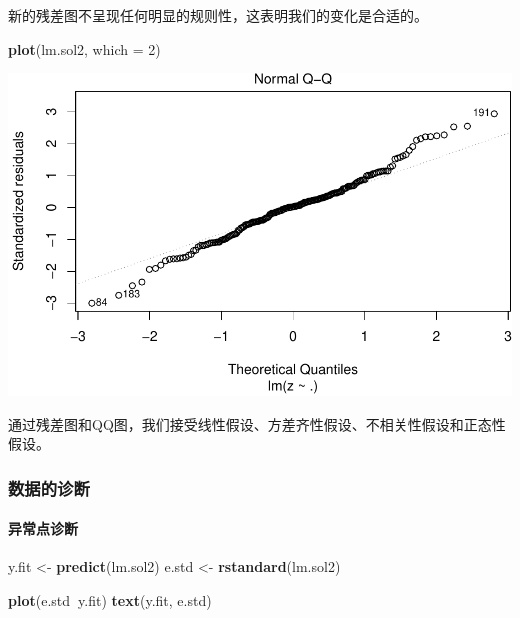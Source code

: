 \documentclass[]{article}
\newenvironment{Shaded}{\begin{snugshade}}{\end{snugshade}}
\newcommand{\KeywordTok}[1]{\textcolor[rgb]{0.13,0.29,0.53}{\textbf{#1}}}
\newcommand{\DataTypeTok}[1]{\textcolor[rgb]{0.13,0.29,0.53}{#1}}
\newcommand{\DecValTok}[1]{\textcolor[rgb]{0.00,0.00,0.81}{#1}}
\newcommand{\StringTok}[1]{\textcolor[rgb]{0.31,0.60,0.02}{#1}}
\newcommand{\OperatorTok}[1]{\textcolor[rgb]{0.81,0.36,0.00}{\textbf{#1}}}
\newcommand{\NormalTok}[1]{#1}
\let\oldparagraph\paragraph
\renewcommand{\paragraph}[1]{\oldparagraph{#1}\mbox{}}
\begin{document}
新的残差图不呈现任何明显的规则性，这表明我们的变化是合适的。

\begin{Shaded}
\begin{Highlighting}[]
\KeywordTok{plot}\NormalTok{(lm.sol2, }\DataTypeTok{which =} \DecValTok{2}\NormalTok{)}
\end{Highlighting}
\end{Shaded}

\includegraphics{FinalProjectForRegressionAnalysis_files/figure-latex/unnamed-chunk-11-1.pdf}

通过残差图和QQ图，我们接受线性假设、方差齐性假设、不相关性假设和正态性假设。

\subsubsection{数据的诊断}

\paragraph{异常点诊断}

\begin{Shaded}
\begin{Highlighting}[]
\NormalTok{y.fit <-}\StringTok{ }\KeywordTok{predict}\NormalTok{(lm.sol2)}
\NormalTok{e.std <-}\StringTok{ }\KeywordTok{rstandard}\NormalTok{(lm.sol2)}

\KeywordTok{plot}\NormalTok{(e.std}\OperatorTok{~}\NormalTok{y.fit)}
\KeywordTok{text}\NormalTok{(y.fit, e.std)}
\end{Highlighting}
\end{Shaded}
\end{document}
